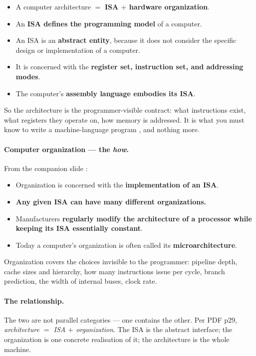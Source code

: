 \begin{itemize}
  \item A computer architecture $=$ \textbf{ISA $+$ hardware organization}.
  \item An \textbf{ISA defines the programming model} of a computer.
  \item An ISA is an \textbf{abstract entity}, because it does not consider the
    specific design or implementation of a computer.
  \item It is concerned with the \textbf{register set, instruction set, and
    addressing modes}.
  \item The computer's \textbf{assembly language embodies its ISA}.
\end{itemize}

So the architecture is the programmer-visible contract: what instructions exist,
what registers they operate on, how memory is addressed. It is what you must
know to write a machine-language program , and
nothing more.

\paragraph{Computer organization — the \emph{how}.}
From the companion slide :

\begin{itemize}
  \item Organization is concerned with the \textbf{implementation of an ISA}.
  \item \textbf{Any given ISA can have many different organizations.}
  \item Manufacturers \textbf{regularly modify the architecture of a processor
    while keeping its ISA essentially constant}.
  \item Today a computer's organization is often called its
    \textbf{microarchitecture}.
\end{itemize}

Organization covers the choices invisible to the programmer: pipeline depth,
cache sizes and hierarchy, how many instructions issue per cycle, branch
prediction, the width of internal buses, clock rate.

\paragraph{The relationship.}
The two are not parallel categories — one contains the other. Per PDF p29,
\emph{architecture $=$ ISA $+$ organization}. The ISA is the abstract interface;
the organization is one concrete realisation of it; the architecture is the
whole machine.

